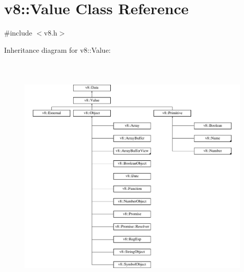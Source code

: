 \hypertarget{classv8_1_1Value}{}\section{v8\+:\+:Value Class Reference}
\label{classv8_1_1Value}


{\ttfamily \#include $<$v8.\+h$>$}

Inheritance diagram for v8\+:\+:Value\+:\begin{figure}[H]
\begin{center}
\leavevmode
\includegraphics[height=11.914893cm]{classv8_1_1Value}
\end{center}
\end{figure}
